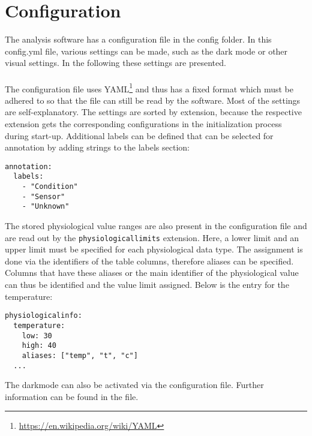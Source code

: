 
\chapter{Configuration}
The analysis software has a configuration file in the config folder. In this config.yml file, various settings can be made, such as the dark mode or other visual settings. In the following these settings are presented.\\
\\
The configuration file uses YAML\footnote{\url{https://en.wikipedia.org/wiki/YAML}} and thus has a fixed format which must be adhered to so that the file can still be read by the software. Most of the settings are self-explanatory. The settings are sorted by extension, because the respective extension gets the corresponding configurations in the initialization process during start-up. Additional labels can be defined that can be selected for annotation by adding strings to the labels section:
\begin{lstlisting}[caption=List of available labels for annotation.]
annotation:
  labels:
    - "Condition"
    - "Sensor"
    - "Unknown"
\end{lstlisting}
The stored physiological value ranges are also present in the configuration file and are read out by the \texttt{physiologicallimits} extension. Here, a lower limit and an upper limit must be specified for each physiological data type. The assignment is done via the identifiers of the table columns, therefore aliases can be specified. Columns that have these aliases or the main identifier of the physiological value can thus be identified and the value limit assigned. Below is the entry for the temperature:
\begin{lstlisting}[caption=Physiological info for temperature.]
physiologicalinfo:
  temperature:
    low: 30
    high: 40
    aliases: ["temp", "t", "c"]
  ...
\end{lstlisting}
The darkmode can also be activated via the configuration file. Further information can be found in the file.